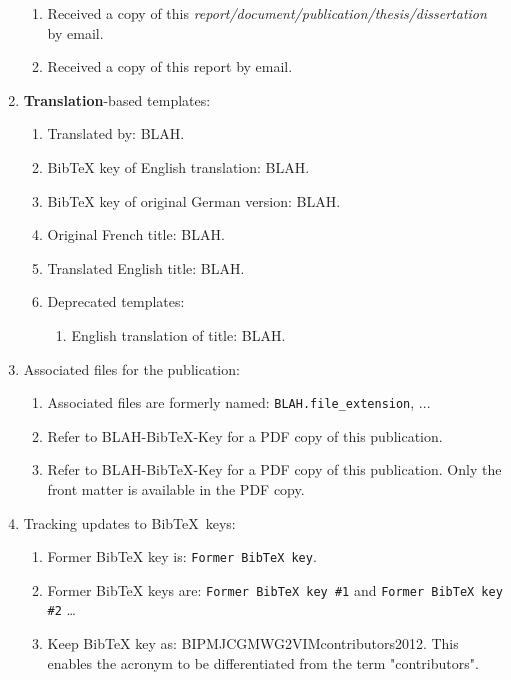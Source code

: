\documentclass[letter,12pt]{article}
\begin{document}
\begin{enumerate}
	\begin{enumerate} \itemsep -2pt
	\item Received a copy of this {\it report/document/publication/thesis/dissertation} by email.
	\item Received a copy of this report by email.
	\end{enumerate}
\item {\bf Translation}-based templates: \vspace{-0.3cm}
	\begin{enumerate} \itemsep -2pt
	\item Translated by: BLAH.
	\item BibTeX key of English translation: BLAH.
	\item BibTeX key of original German version: BLAH.
	\item Original French title: BLAH.
	\item Translated English title: BLAH.
	\item Deprecated templates: \vspace{-0.2cm}
		\begin{enumerate} \itemsep -2pt
		\item English translation of title: BLAH.
		\end{enumerate}
	\end{enumerate}
\item Associated files for the publication: \vspace{-0.3cm}
	\begin{enumerate} \itemsep -2pt
	\item Associated files are formerly named: {\tt BLAH.file\_extension}, ...
	\item Refer to BLAH-BibTeX-Key for a PDF copy of this publication.
	\item Refer to BLAH-BibTeX-Key for a PDF copy of this publication. Only the front matter is available in the PDF copy.
	\end{enumerate}
\item Tracking updates to {\sc Bib}\TeX\ keys: \vspace{-0.3cm}
	\begin{enumerate} \itemsep -2pt
	\item Former BibTeX key is: {\tt Former BibTeX key}.
	\item Former BibTeX keys are: {\tt Former BibTeX key \#1} and {\tt Former BibTeX key \#2} \dots
	\item Keep BibTeX key as: BIPMJCGMWG2VIMcontributors2012. This enables the acronym to be differentiated from the term "contributors".

\end{enumerate}
\end{enumerate}
\end{document}
